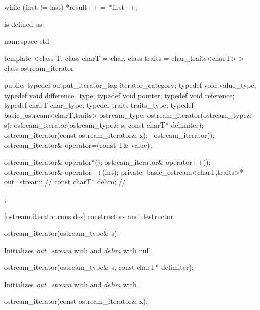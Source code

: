 \begin{codeblock}
while (first != last)
  *result++ = *first++;
\end{codeblock}

\pnum
{}
is defined as:

\begin{codeblock}
namespace std {
  template <class T, class charT = char, class traits = char_traits<charT> >
  class ostream_iterator {
  public:
    typedef output_iterator_tag iterator_category;
    typedef void value_type;
    typedef void difference_type;
    typedef void pointer;
    typedef void reference;
    typedef charT char_type;
    typedef traits traits_type;
    typedef basic_ostream<charT,traits> ostream_type;
    ostream_iterator(ostream_type& s);
    ostream_iterator(ostream_type& s, const charT* delimiter);
    ostream_iterator(const ostream_iterator& x);
   ~ostream_iterator();
    ostream_iterator& operator=(const T& value);

    ostream_iterator& operator*();
    ostream_iterator& operator++();
    ostream_iterator& operator++(int);
  private:
    basic_ostream<charT,traits>* out_stream;  // \expos
    const charT* delim;                       // \expos
  };
}
\end{codeblock}

[ostream.iterator.cons.des]{ constructors and destructor}


%
\begin{itemdecl}
ostream_iterator(ostream_type& s);
\end{itemdecl}

\begin{itemdescr}
\pnum
\effects
Initializes \textit{out_stream} with  and
\textit{delim} with null.
\end{itemdescr}


%
\begin{itemdecl}
ostream_iterator(ostream_type& s, const charT* delimiter);
\end{itemdecl}

\begin{itemdescr}
\pnum
\effects
Initializes \textit{out_stream} with  and
\textit{delim} with .
\end{itemdescr}


%
\begin{itemdecl}
ostream_iterator(const ostream_iterator& x);
\end{itemdecl}

